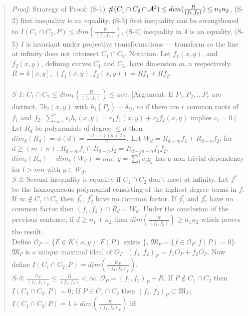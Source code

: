 \begin{quote}
\emph{Proof:}
Strategy of Proof: (S-1) $\#(C_1 \cap C_2 \cap {\cal A}^2) \le
dim({\frac R {(f_1 , f_2)}}) \le n_1 n_2$, (S-2) first inequality is an equality,
(S-3) first inequality can be strengthened to
$I(C_1 \cap C_2,P) \le dim({\frac R {(f_1 , f_2)}})$, 
(S-4) inequality in 4 is an equality,
(S-5) $I$ is invariant under projective transformations --- transform so the line at
infinity does not intersect $C_1 \cap C_2$.
Notation: Let $f_1 (x, y)$, and $f_2 (x, y)$, defining curves
$C_1$ and $C_2$, have dimension $m, n$ respectively.
$R= k[x, y]$, $(f_1 (x, y), f_2 (x, y))= R f_1 + R f_2$.
\\
\\
\emph{S-1:}
$C_1 \cap C_2 \leq dim_k ({\frac {R} {(f_1 , f_2 )}}) \leq mn$. [Argument:
If $P_1, P_2, \ldots P_r$ are distinct, $\exists h_i (x,y)$ with
$h_i (P_j ) = \delta_{ij}$, so if there are $r$ common roots of $f_1$ and
$f_2$,
$\sum_{i=1}^r c_i h_i (x,y) = r_1 f_1 (x,y) + r_2 f_2 (x,y)$ implies $c_i=
0$.] \\
Let $R_d$ be polynomials of degree $\leq d$ then
$dim_k (R_d )= \phi (d) = {\frac {(d+1)(d+2)} {2}}$.
Let $W_d = R_{d-m }f_1 + R_{d-n}f_2$, for $d \geq (m+n)$.
$R_{d-m}f_1 \cap R_{d-n} f_2 = R_{d-m-n} f_1 f_2$.
$dim_k ( R_d ) - dim_k (W_d )= mn$.
$g= \sum_i^l c_j g_j$ has a non-trivial dependency for $l>mn$ with
$g \in W_d$.
\\
\emph{S-2:}
Second inequality is equality if $C_1 \cap C_2$ don't meet at infinity. 
Let $f^*$ be the homogeneous polynomial consisting of the highest degree terms
in $f$.  If $\infty \notin C_1 \cap C_2$ then $f_1^*$, $f_2^*$ have no common factor.
If $f_1^*$ and $f_2^*$ have no common factor then $(f_1 , f_2) \cap R_d= W_d$.
Under the conclusion of the previous sentence, if $d \ge n_1 + n_2$ then
$dim({\frac R {(f_1 , f_2)}}) \ge n_1 n_2$ which proves the result.
\\
Define ${\mathcal O}_P= \{ F \in K(x, y): F(P)$ exists $\}$, 
${\mathfrak M}_P= \{ f \in {\mathcal O}_P: f(P)= 0 \}$.
${\mathfrak M}_P$ is a unique maximal ideal of $O_P$.  $(f_1, f_2)_P= f_1 O_P + f_2 O_P$.
Now define $I(C_1 \cap C_2; P)= dim( {\frac {{\mathcal O}_P} {(f_1 , f_2)_P}})$.
\\
\emph{S-3:} 
${\frac {{\mathcal O}_P} {(f_1 , f_2)_P}} \le {\frac {R} {(f_1, f_2)}} < \infty$.
${\mathcal O}_P = (f_1 , f_2)_P +R$.
If $P \notin C_1 \cap C_2$ then $I(C_1 \cap C_2, P)=0$;
If $P \in C_1 \cap C_2$ then $(f_1 , f_2)_P \subset {\mathfrak M}_P$;
$I(C_1 \cap C_2; P) = 1 + dim({\frac R {(f_1 , f_2)_P}})$ iff

\end{quote}
